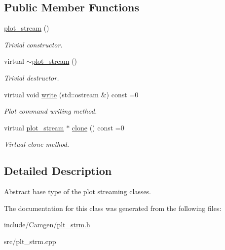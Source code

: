\subsection*{Public Member Functions}
\begin{DoxyCompactItemize}
\item 
\hypertarget{a00427_a55d9ade8007c07c115c2cb837d895d37}{\hyperlink{a00427_a55d9ade8007c07c115c2cb837d895d37}{plot\-\_\-stream} ()}\label{a00427_a55d9ade8007c07c115c2cb837d895d37}

\begin{DoxyCompactList}\small\item\em Trivial constructor. \end{DoxyCompactList}\item 
\hypertarget{a00427_a6510b1620aa6fa695c1f1397e92bea4c}{virtual \hyperlink{a00427_a6510b1620aa6fa695c1f1397e92bea4c}{$\sim$plot\-\_\-stream} ()}\label{a00427_a6510b1620aa6fa695c1f1397e92bea4c}

\begin{DoxyCompactList}\small\item\em Trivial destructor. \end{DoxyCompactList}\item 
\hypertarget{a00427_a1bf2748c2bb6da34a39b10b303abd9bf}{virtual void \hyperlink{a00427_a1bf2748c2bb6da34a39b10b303abd9bf}{write} (std\-::ostream \&) const =0}\label{a00427_a1bf2748c2bb6da34a39b10b303abd9bf}

\begin{DoxyCompactList}\small\item\em Plot command writing method. \end{DoxyCompactList}\item 
\hypertarget{a00427_a8f00766cd1d70da570f2d7f769d4ac42}{virtual \hyperlink{a00427}{plot\-\_\-stream} $\ast$ \hyperlink{a00427_a8f00766cd1d70da570f2d7f769d4ac42}{clone} () const =0}\label{a00427_a8f00766cd1d70da570f2d7f769d4ac42}

\begin{DoxyCompactList}\small\item\em Virtual clone method. \end{DoxyCompactList}\end{DoxyCompactItemize}


\subsection{Detailed Description}
Abstract base type of the plot streaming classes. 

The documentation for this class was generated from the following files\-:\begin{DoxyCompactItemize}
\item 
include/\-Camgen/\hyperlink{a00700}{plt\-\_\-strm.\-h}\item 
src/plt\-\_\-strm.\-cpp\end{DoxyCompactItemize}
